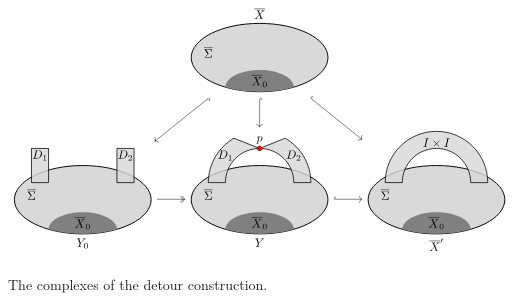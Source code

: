 \documentclass[reqno]{amsart}
\theoremstyle{definition}
\renewcommand{\bar}{\overline}
\numberwithin{equation}{section}
\begin{document}
\begin{figure}[ht]
\[
\begin{tikzcd}[row sep=2pc, column sep=2pc]
&\begin{tikzpicture}[baseline=-.5ex]
\node[above] at (0,1) {\(\bar X\)};
\draw[thick,fill=gray!30] (0,0) ellipse (2 and 1);
\node at (-1.5,0) {\(\bar\Sigma\)};
\fill[gray] ({2*cos(-120)},{sin(-120)}) arc (-120:-60:2 and 1) arc (0:180:1 and 0.5) -- cycle;
\node[above] at (0,-1) {\(\bar X_0\)};
\end{tikzpicture}
\ar[ld,hookrightarrow] \ar[d,hookrightarrow] \ar[rd,hookrightarrow] 
\\
\begin{tikzpicture}[baseline=-.5ex]
\draw[thick,fill=gray!30] (0,0) ellipse (2 and 1);
\node at (-1.5,0) {\(\bar\Sigma\)};
\fill[gray] ({2*cos(-120)},{sin(-120)}) arc (-120:-60:2 and 1) arc (0:180:1 and 0.5) -- cycle;
\node[above] at (0,-1) {\(\bar X_0\)};
\draw[thick,fill=gray!30, opacity=0.8] (-1,0.5) rectangle ++(-0.5,1) (1,0.5) rectangle ++(0.5,1);
\node at (-1.25,1.2) {\(D_1\)};
\node at (1.25,1.2) {\(D_2\)};
\node[below] at (0,-1) {\(Y_0\)};
\end{tikzpicture}
\ar[r,twoheadrightarrow]
&\begin{tikzpicture}[baseline=-.5ex]
\draw[thick,fill=gray!30] (0,0) ellipse (2 and 1);
\node at (-1.5,0) {\(\bar\Sigma\)};
\fill[gray] ({2*cos(-120)},{sin(-120)}) arc (-120:-60:2 and 1) arc (0:180:1 and 0.5) -- cycle;
\node[above] at (0,-1) {\(\bar X_0\)};
\draw[thick,fill=gray!30, opacity=0.8] (0,0.5) ++(120:1.5) arc (120:180:1.5) -- ++(0.5,0) arc (180:0:1) -- ++(0.5,0) arc (0:60:1.5) -- (0,1.5) -- cycle;
\draw[fill=red] (0,1.5) circle (2pt) node[above] {\(p\)};
\node at (-1,1.2) {\(D_1\)};
\node at (1,1.2) {\(D_2\)};
\node[below] at (0,-1) {\(Y\)};
\end{tikzpicture}
\ar[r,hookrightarrow]
&\begin{tikzpicture}[baseline=-.5ex]
\draw[thick,fill=gray!30] (0,0) ellipse (2 and 1);
\node at (-1.5,0) {\(\bar\Sigma\)};
\fill[gray] ({2*cos(-120)},{sin(-120)}) arc (-120:-60:2 and 1) arc (0:180:1 and 0.5) -- cycle;
\node[above] at (0,-1) {\(\bar X_0\)};
\draw[thick,fill=gray!30, opacity=0.8] (-1.5,0.5) -- ++(0.5,0) arc (180:0:1) -- ++(0.5,0) arc (0:180:1.5);
\node at (0,1.55) {\(I\times I\)};
\node[below] at (0,-1) {\(\bar X'\)};
\end{tikzpicture}
\end{tikzcd}
\]
\caption{The complexes of the detour construction. 
}
\label{fig:detour-band}
\end{figure}
\end{document}
